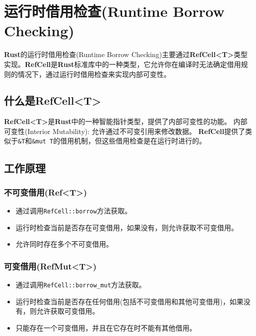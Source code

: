 \documentclass[oneside]{book}
\begin{document}
\section{运行时借用检查(Runtime Borrow Checking)}{
    \textbf{Rust}的运行时借用检查(Runtime Borrow Checking)主要通过\textbf{RefCell<T>}类型实现。\textbf{RefCell}是\textbf{Rust}标准库中的一种类型，它允许你在编译时无法确定借用规则的情况下，通过运行时借用检查来实现内部可变性。

    \subsection{什么是\textbf{RefCell<T>}}{
        \textbf{RefCell<T>}是\textbf{Rust}中的一种智能指针类型，提供了内部可变性的功能。
        内部可变性(Interior Mutability): 允许通过不可变引用来修改数据。
        \textbf{RefCell}提供了类似于\texttt{\&T}和\texttt{\&mut T}的借用机制，但这些借用检查是在运行时进行的。
    }

    \subsection{工作原理}{

        \subsubsection{不可变借用(\textbf{Ref<T>})}{
            \begin{itemize}
                \item 通过调用\texttt{RefCell::borrow}方法获取。
                \item 运行时检查当前是否存在可变借用，如果没有，则允许获取不可变借用。
                \item 允许同时存在多个不可变借用。
            \end{itemize}
        }

        \subsubsection{可变借用(\textbf{RefMut<T>})}{
            \begin{itemize}
                \item 通过调用\texttt{RefCell::borrow\_mut}方法获取。
                \item 运行时检查当前是否存在任何借用(包括不可变借用和其他可变借用)，如果没有，则允许获取可变借用。
                \item 只能存在一个可变借用，并且在它存在时不能有其他借用。
            \end{itemize}
        }
    }

}
\end{document}
